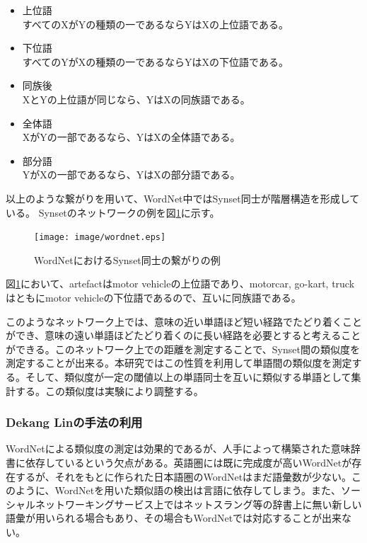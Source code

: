 \documentclass[12pt]{jarticle}
\begin{document}
\begin{itemize}
\item 上位語 \\
すべてのXがYの種類の一であるならYはXの上位語である。
\item 下位語 \\
すべてのYがXの種類の一であるならYはXの下位語である。
\item 同族後 \\
XとYの上位語が同じなら、YはXの同族語である。
\item 全体語\\
XがYの一部であるなら、YはXの全体語である。
\item 部分語 \\
YがXの一部であるなら、YはXの部分語である。
\end{itemize}

以上のような繋がりを用いて、WordNet中ではSynset同士が階層構造を形成している。
Synsetのネットワークの例を図\ref{word_net}に示す。

\begin{figure}[htbp]
  \begin{center}
    \texttt{[image: image/wordnet.eps]}
  \end{center}
  \caption{WordNetにおけるSynset同士の繋がりの例}
  \label{word_net}
\end{figure}

図\ref{word_net}において、artefactはmotor vehicleの上位語であり、motorcar, go-kart, truckはともにmotor vehicleの下位語であるので、互いに同族語である。

このようなネットワーク上では、意味の近い単語ほど短い経路でたどり着くことができ、意味の遠い単語ほどたどり着くのに長い経路を必要とすると考えることができる。このネットワーク上での距離を測定することで、Synset間の類似度を測定することが出来る\cite{wordnet-similarity}。本研究ではこの性質を利用して単語間の類似度を測定する。そして、類似度が一定の閾値以上の単語同士を互いに類似する単語として集計する。この類似度は実験により調整する。

\subsubsection{Dekang Linの手法の利用}
WordNetによる類似度の測定は効果的であるが、人手によって構築された意味辞書に依存しているという欠点がある。英語圏には既に完成度が高いWordNetが存在するが、それをもとに作られた日本語圏のWordNetはまだ語彙数が少ない。このように、WordNetを用いた類似語の検出は言語に依存してしまう。また、ソーシャルネットワーキングサービス上ではネットスラング等の辞書上に無い新しい語彙が用いられる場合もあり、その場合もWordNetでは対応することが出来ない。
\end{document}
